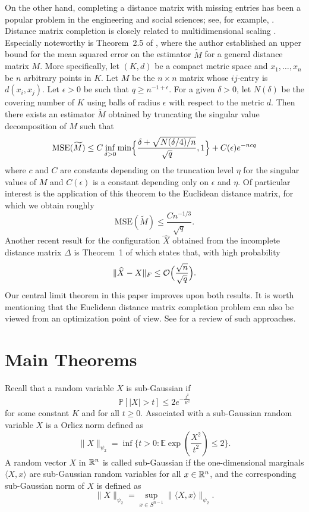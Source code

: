On the other hand, completing a distance matrix with missing entries
has been a popular problem in the engineering and social sciences;
see, for example, \cite{Alfakih1999,Bakonyi,Singer9507, Spence1974}
. Distance matrix completion is closely related to multidimensional
scaling \citep{BGbook,Chatterjee, Javanmard2013, Montanari}. Especially
noteworthy is Theorem~2.5 of \cite{Chatterjee}, where the author
established an upper bound for the mean squared error on the estimator
$\tilde{M}$ for a general distance matrix $M$. More specifically, let
$(K,d)$ be a compact metric space and $x_1, \dots, x_n$ be $n$
arbitrary points in $K$. Let $M$ be the $n \times n$ matrix whose
$ij$-entry is $d(x_i,x_j)$. Let $\epsilon > 0$ be such that $q \geq
n^{-1 + \epsilon}$. For a given $\delta > 0$, let $N(\delta)$ be the
covering number of $K$ using balls of radius $\epsilon$ with respect
to the metric $d$. Then there exists an estimator $\tilde{M}$ obtained
by truncating the singular value decomposition of $M$ such that
$$ \mathrm{MSE}(\tilde{M}) \leq C \inf_{\delta > 0} \min \Bigl\{  \frac{\delta + \sqrt{ N(\delta/4) /n}}{\sqrt{q}} , 1 \Bigr \} + C(\epsilon) e^{-ncq}$$
where $c$ and $C$ are constants depending on the truncation level $\eta$ for 
the singular values of $M$ and $C(\epsilon)$ is a constant depending only on $\epsilon$ and $\eta$. Of particular interest is the application of this theorem to the
Euclidean distance matrix, for which we obtain roughly
$$\textrm{MSE} (\tilde{M}) \leq \frac{Cn^{-1/3}}{\sqrt{q}}.$$ 
Another recent result for the configuration $\hat{X}$ obtained from the incomplete distance matrix $\Delta$
is Theorem~1 of \cite{Taghizadeh} which states that, with high
probability
$$\|\hat{X} - X\|_F \leq \mathcal{O}\Bigl(\frac{\sqrt{n}}{\sqrt{q}}\Bigr).$$ 
Our central limit theorem in this paper improves upon both results.  It is worth mentioning that the Euclidean distance matrix completion problem can also be
viewed from an optimization point of view. See
\cite{Tasissa2018ExactRO} for a review of such approaches.


\section{Main Theorems}
\label{main}

Recall that a random variable $X$ is sub-Gaussian if 
$$\mathbb{P}[ | X | > t] \leq 2 e^{ -\frac{t^2}{ {K}^2} }$$ 
for some constant $K$ and for
all $t \geq 0$.  Associated with a sub-Gaussian random variable $X$ is a
Orlicz norm defined as 
$$ \| X \|_{\psi_2} = \inf \{ t >0 : \mathbb{E}\exp(\frac{X^2 }{t^2}) \leq 2 \}.$$  
A random vector $X$ in $\R^n$ is called sub-Gaussian if the one-dimensional marginals $\big \langle X,
x \big \rangle$ are sub-Gaussian random variables for all $x \in
\R^n$, and the corresponding sub-Gaussian norm of $X$ is defined as
$$\|X\|_{\psi_2} = \sup\limits_{x \in S^{n-1}} \| \big \langle X, x \big \rangle \|_{\psi_2}.$$


